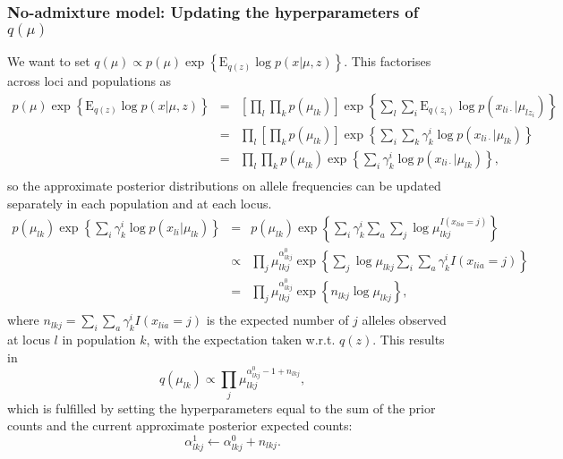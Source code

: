 \documentclass[12pt,a4paper,reqno]{article}
\newcommand{\E}{\text{E}{}}
\newcommand{\(}{\left(}
\newcommand{\)}{\right)}
\newcommand{\|}{\arrowvert}
\begin{document}
\subsubsection{No-admixture model: Updating the hyperparameters of $q(\mu)$} \label{q(mu)-update-no-admixture}
We want to set $q(\mu) \propto p(\mu)\exp\left\{\E_{q(z)} \log p(x|\mu,z)\right\}$. This factorises across loci and populations as
\begin{eqnarray*}
  p(\mu)\exp\left\{\E_{q(z)} \log p(x|\mu,z)\right\} 
&=& \left[\prod_{l}\prod_{k}p(\mu_{lk})\right]\exp\left\{\sum_{l} \sum_{i}\E_{q(z_{i})} \log p(x_{li\cdot}|\mu_{lz_{i}})\right\} \\
&=& \prod_{l}\left[\prod_{k}p(\mu_{lk})\right]\exp\left\{\sum_{i} \sum_{k} \gamma^{i}_{k}\log p(x_{li\cdot}|\mu_{lk})\right\} \\
&=& \prod_{l}\prod_{k}p(\mu_{lk})\exp\left\{\sum_{i} \gamma^{i}_{k}\log p(x_{li\cdot}|\mu_{lk})\right\}, \\
\end{eqnarray*}
so the approximate posterior distributions on allele frequencies can be updated separately in each population and at each locus.
\begin{eqnarray*}
p(\mu_{lk})\exp\left\{\sum_{i} \gamma^{i}_{k}\log p(x_{li}|\mu_{lk})\right\}
&=& p(\mu_{lk})\exp\left\{\sum_{i} \gamma^{i}_{k}\sum_{a}\sum_{j}\log \mu_{lkj}^{I(x_{lia}=j)}\right\} \\
&\propto& \prod_{j}\mu_{lkj}^{\alpha^{0}_{lkj}}\exp\left\{\sum_{j} \log \mu_{lkj} \sum_{i} \sum_{a}\gamma^{i}_{k}I(x_{lia}=j)\right\} \\
&=& \prod_{j}\mu_{lkj}^{\alpha^{0}_{lkj}}\exp\left\{n_{lkj}\log \mu_{lkj}\right\},\\
\end{eqnarray*}
where $n_{lkj} = \sum_{i} \sum_{a}\gamma^{i}_{k}I(x_{lia}=j)$ is the expected number of $j$ alleles observed at locus $l$ in population $k$, with the expectation taken w.r.t. $q(z)$. This results in
\begin{equation*}
  q(\mu_{lk}) \propto \prod_{j} \mu_{lkj}^{\alpha^{0}_{lkj} - 1 + n_{lkj}},
\end{equation*}
which is fulfilled by setting the hyperparameters equal to the sum of the prior counts and the current approximate posterior expected counts:
\begin{equation*}
  \alpha^{1}_{lkj} \leftarrow \alpha^{0}_{lkj} + n_{lkj}.
\end{equation*}
\end{document}
